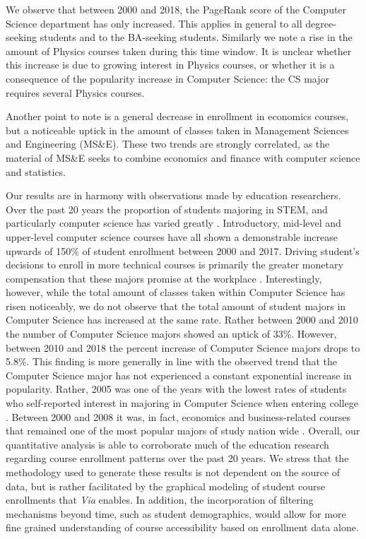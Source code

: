 \documentclass{sigchi}
\begin{document}
We observe that between 2000 and 2018, the PageRank score of the
Computer Science department has only increased. This applies in
general to all degree-seeking students and to the BA-seeking
students. Similarly we note a rise in the amount of Physics courses
taken during this time window. It is unclear whether this increase is
due to growing interest in Physics courses, or whether it is a
consequence of the popularity increase in Computer Science: the CS
major requires several Physics courses.

Another point to note is a general decrease in enrollment in economics
courses, but a noticeable uptick in the amount of classes taken in
Management Sciences and Engineering (MS\&E). These two trends are
strongly correlated, as the material of MS\&E seeks to combine
economics and finance with computer science and statistics.

Our results are in harmony with observations made by education researchers. Over the past 20 years the proportion of students majoring in STEM, and particularly computer science has varied greatly \cite{ComputingResearchAssociation2017}. Introductory, mid-level and upper-level computer science courses have all shown a demonstrable increase upwards of 150\% of student enrollment between 2000 and 2017. Driving student's decisions to enroll in more technical courses is primarily the greater monetary compensation that these majors promise at the workplace \cite{Downey2007}. Interestingly, however, while the total amount of classes taken within Computer Science has risen noticeably, we do not observe that the total amount of student majors in Computer Science has increased at the same rate. Rather between 2000 and 2010 the number of Computer Science majors showed an uptick of 33\%. However, between 2010 and 2018 the percent increase of Computer Science majors drops to 5.8\%. This finding is more generally in line with the observed trend that the Computer Science major has not experienced a constant exponential increase in popularity. Rather, 2005 was one of the years with the lowest rates of students who self-reported interest in majoring in Computer Science when entering college \cite{Patterson2005}. Between 2000 and 2008 it was, in fact, economics and business-related courses that remained one of the most popular majors of study nation wide \cite{NationalCenterforEducation2018}. Overall, our quantitative analysis is able to corroborate much of the education research regarding course enrollment patterns over the past 20 years. We stress that the methodology used to generate these results is not dependent on the source of data, but is rather facilitated by the graphical modeling of student course enrollments that \textit{Via} enables. In addition, the incorporation of filtering mechanisms beyond time, such as student demographics, would allow for more fine grained understanding of course accessibility based on enrollment data alone.
\end{document}

